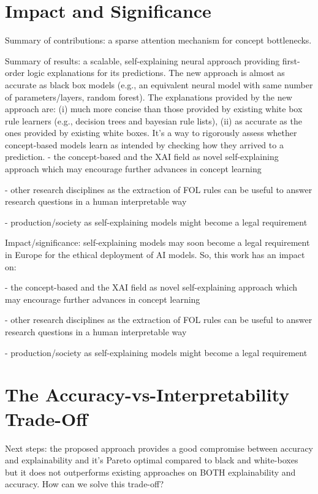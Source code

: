 \documentclass[withindex,glossary]{cam-thesis}
\begin{document}
\section{Impact and Significance}
Summary of contributions: a sparse attention mechanism for concept bottlenecks.

Summary of results: a scalable, self-explaining neural approach providing first-order logic explanations for its predictions. The new approach is almost as accurate as black box models (e.g., an equivalent neural model with same number of parameters/layers, random forest). The explanations provided by the new approach are: (i) much more concise than those provided by existing white box rule learners (e.g., decision trees and bayesian rule lists), (ii) as accurate as the ones provided by existing white boxes. It's a way to rigorously assess whether concept-based models learn as intended by checking how they arrived to a prediction.
- the concept-based and the XAI field as novel self-explaining approach which may encourage further advances in concept learning

- other research disciplines as the extraction of FOL rules can be useful to answer research questions in a human interpretable way

- production/society as self-explaining models might become a legal requirement


Impact/significance: self-explaining models may soon become a legal requirement in Europe for the ethical deployment of AI models. So, this work has an impact on:

- the concept-based and the XAI field as novel self-explaining approach which may encourage further advances in concept learning

- other research disciplines as the extraction of FOL rules can be useful to answer research questions in a human interpretable way

- production/society as self-explaining models might become a legal requirement


\section{The Accuracy-vs-Interpretability Trade-Off}
Next steps: the proposed approach provides a good compromise between accuracy and explainability and it's Pareto optimal compared to black and white-boxes but it does not outperforms existing approaches on BOTH explainability and accuracy. How can we solve this trade-off?
\end{document}

